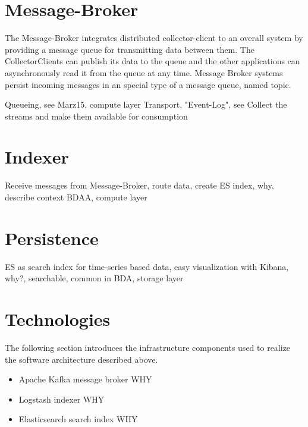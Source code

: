 %
\section{Message-Broker}

The Message-Broker integrates distributed collector-client to an overall system by providing a
message queue for transmitting data between them. The CollectorClients can publish
its data to the queue and the other applications can asynchronously read it from the queue at any time.
Message Broker systems persist incoming messages in an special type of a message queue, named topic.

Queueing, see Marz15, compute layer
Transport, "Event-Log", see \cite{Kreps13}
Collect the streams and make them available for consumption

\section{Indexer}

Receive messages from Message-Broker, route data, create ES index, why, describe context BDAA, compute layer

\section{Persistence}

ES as search index for time-series based data, easy visualization with Kibana, why?, searchable, common in BDA, storage layer

\section{Technologies}

The following section introduces the infrastructure components used to realize the software architecture described above.

\begin{itemize}
	\item Apache Kafka message broker  WHY
	\item Logstash indexer  WHY
	\item Elasticsearch search index  WHY
\end{itemize}

